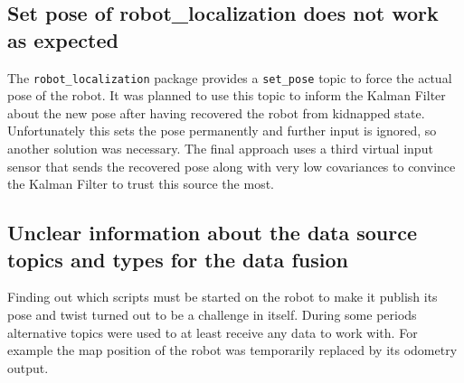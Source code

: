 \subsection{Set pose of robot\_localization does not work as expected}
The \texttt{robot\_localization} package provides a \texttt{set\_pose} topic to force the actual pose of the robot. It was planned to use this topic to inform the Kalman Filter about the new pose after having recovered the robot from kidnapped state. Unfortunately this sets the pose permanently and further input is ignored, so another solution was necessary. The final approach uses a third virtual input sensor that sends the recovered pose along with very low covariances to convince the Kalman Filter to trust this source the most.

\subsection{Unclear information about the data source topics and types for the data fusion}
Finding out which scripts must be started on the robot to make it publish its pose and twist turned out to be a challenge in itself. During some periods alternative topics were used to at least receive any data to work with. For example the map position of the robot was temporarily replaced by its odometry output.